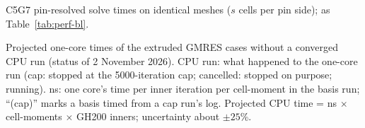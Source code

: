\begin{table}[h]
\caption{C5G7 pin-resolved solve times on identical meshes ($s$ cells per pin
side); as Table~\ref{tab:perf-bl}.}
\label{tab:perf-c5g7}
\end{table}

\begin{table}[h]
\caption{Projected one-core times of the extruded GMRES cases without a
converged CPU run (status of 2 November 2026). CPU run: what happened to the
one-core run (cap: stopped at the 5000-iteration cap; cancelled: stopped on
purpose; running). ns: one core's time per inner iteration per cell-moment
in the basis run; ``(cap)'' marks a basis timed from a cap run's log.
Projected CPU time = ns $\times$ cell-moments $\times$ GH200 inners;
uncertainty about $\pm 25$\%.}
\label{tab:perf-proj}
\end{table}


